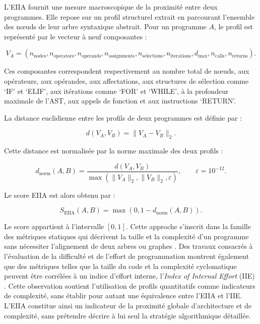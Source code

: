 L'EIIA fournit une mesure macroscopique de la proximité entre deux programmes.
Elle repose sur un profil structurel extrait en parcourant l'ensemble des
nœuds de leur arbre syntaxique abstrait. Pour un programme $A$, le profil est
représenté par le vecteur à neuf composantes :

\begin{equation}
V_A = (n_{\mathrm{nodes}}, n_{\mathrm{operators}},
n_{\mathrm{operands}}, n_{\mathrm{assignments}}, n_{\mathrm{selections}},
n_{\mathrm{iterations}}, d_{\max}, n_{\mathrm{calls}}, n_{\mathrm{returns}}).
\end{equation}

Ces composantes correspondent respectivement au nombre total de nœuds, aux
opérateurs, aux opérandes, aux affectations, aux structures de sélection comme
`IF' et `ELIF', aux itérations comme `FOR' et `WHILE', à la profondeur maximale
de l'AST, aux appels de fonction et aux instructions `RETURN'.

La distance euclidienne entre les profils de deux programmes est définie par :

\begin{equation}
d(V_A,V_B) = \lVert V_A - V_B \rVert_2.
\end{equation}

Cette distance est normalisée par la norme maximale des deux profils :

\begin{equation}
d_{\mathrm{norm}}(A,B) =
\frac{d(V_A,V_B)}{\max\left(\lVert V_A \rVert_2,
\lVert V_B \rVert_2,\varepsilon\right)},
\qquad \varepsilon = 10^{-12}.
\end{equation}

Le score EIIA est alors obtenu par :

\begin{equation}
S_{\mathrm{EIIA}}(A,B) = \max\left(0,1-d_{\mathrm{norm}}(A,B)\right).
\end{equation}

Le score appartient à l'intervalle $[0,1]$. Cette approche s'inscrit dans la
famille des métriques statiques qui décrivent la taille et la complexité d'un
programme sans nécessiter l'alignement de deux arbres ou graphes
\cite{messer_2024}. Des travaux consacrés à l'évaluation de la difficulté et
de l'effort de programmation montrent également que des métriques telles que
la taille du code et la complexité cyclomatique peuvent être corrélées à un
indice d'effort interne, l'\emph{Index of Internal Effort} (IIE)
\cite{de_oliveira_assessing_2024}. Cette observation soutient l'utilisation
de profils quantitatifs comme indicateurs de complexité, sans établir pour
autant une équivalence entre l'EIIA et l'IIE. L'EIIA constitue ainsi un indicateur de la
proximité globale d'architecture et de complexité, sans prétendre décrire à
lui seul la stratégie algorithmique détaillée.

